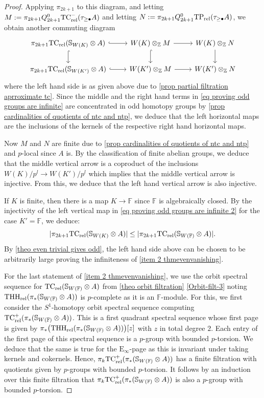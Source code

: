 \documentclass[english,10pt]{amsart}
\newcommand{\sph}{\mathbb{S}}
\newcommand{\sphwf}{\mathbb{S}_{W(\mathbb{F)}}}
\newcommand{\rel}{\textup{rel}}
\newcommand{\field}{\mathbb{F}}
\theoremstyle{definition}
\numberwithin{equation}{section}
\DeclareMathOperator{\thh}{\ensuremath{\textup{THH}}}
\newcommand{\rntc}{\mathrm{TC}_{\rel}^{-}}
\newcommand{\rtp}{\mathrm{TP}_{\rel}}
\newcommand{\rtc}{\mathrm{TC}_{\rel}}
\newcommand{\rthh}{\mathrm{THH}_{\rel}}
\newcommand{\z}{\mathbb{Z}}
\newcommand{\wtw}{\tau_{\geq \bullet}}
\newcommand{\pis}{\pi_*}
\newcommand{\lv}{\lvert}
\newcommand{\rv}{\rvert}
\begin{document}
\begin{proof}
Applying $\pi_{2k+1}$ to this diagram, and letting $M:= \pi_{2k+1 }Q_{2k+1}^0 \rntc(\wtw A)$ and letting $N:= \pi_{2k+1 }Q_{2k+1}^0 \rtp(\wtw A)$, we obtain another commuting diagram
\begin{equation}\label{eq proving odd groups are infinite 2} 
\begin{tikzcd}
\pi_{2k+1}\rtc(\sph_{W(K)} \otimes A) 
\ar[d,hook] \ar[r,hook]& W(K) \otimes_\z M \ar[r] \ar[d,hook]&  W(K) \otimes_\z N\ar[d] \\
\pi_{2k+1}\rtc(\sph_{W(K')} \otimes A) 
 \ar[r,hook] &W(K') \otimes_\z M \ar[r]  &W(K') \otimes_\z N  
\end{tikzcd}
\end{equation}
where the left hand side is as given above due to  \autoref{prop partial filtration aprroximate tc}. Since the middle and the right hand terms in \eqref{eq proving odd groups are infinite} are concentrated in odd homotopy groups by \autoref{prop cardinalities of quotients of ntc and ntp}, we deduce that the left horizontal maps are the inclusions of the kernels of the respective right hand horizontal maps.  

Now $M$ and $N$ are finite due to \autoref{prop cardinalities of quotients of ntc and ntp} and $p$-local since $A$ is. By the classification of finite abelian groups, we deduce that the   middle vertical arrow is a coproduct of the inclusions $W(K)/p^l \to W(K')/p^l$ which implies that the middle vertical  arrow is injective. From this, we deduce that the left hand vertical arrow is also injective. 

If $K$ is finite, then there is a map $K\to \field$ since $\field$ is algebraically closed. By the injectivity of the left vertical map in \eqref{eq proving odd groups are infinite 2} for the case $K' = \field$, we deduce:
\[\lv \pi_{2k+1}\rtc(\sph_{W(K)} \otimes A)\rv \leq \lv \pi_{2k+1}\rtc(\sph_{W(\field)} \otimes A)\rv.\]
 By \autoref{theo even trivial gives odd}, the left hand side above can be chosen to be  arbitrarily  large  proving the infiniteness of  \eqref{item 2 thmevenvanishing}.

 For the last statement of \eqref{item 2 thmevenvanishing}, we use the orbit spectral sequence for $\rtc(\sphwf \otimes A)$ from \autoref{theo orbit filtration} \eqref{Orbit-filt-3} noting $\thh_{\rel}(\pis (\sphwf \otimes A))$ is $p$-complete as it is an $\field$-module. For this, we first consider the $S^1$-homotopy orbit spectral sequence computing $\rtc^+(\pis (\sphwf \otimes A))$. This is a first quadrant spectral sequence whose first page is given by $\pis \big(\rthh(\pis (\sphwf \otimes A))\big)[z]$ with $z$ in total degree $2$. Each entry of the first page of this spectral sequence is a   $p$-group  with bounded $p$-torsion. We deduce that the same is true for the $\mathrm{E}_\infty$-page as this is invariant under taking kernels and cokernels. Hence, $\pi_k\rtc^+(\pis (\sphwf \otimes A))$  has a finite filtration with quotients given by $p$-groups with bounded $p$-torsion. It follows by an induction over this finite filtration that $\pi_k\rtc^+(\pis (\sphwf \otimes A))$ is also a $p$-group with bounded $p$-torsion. 


\end{proof}
\end{document}
